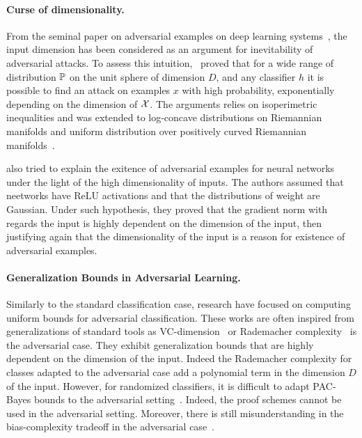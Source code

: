 \paragraph{Curse of dimensionality.} From the seminal paper on adversarial examples on deep learning systems~\citep{Szegedy2013IntriguingPO}, the input dimension has been considered as an argument for inevitability of adversarial attacks. To assess this intuition,~\citet{gilmer2018adversarial,shafahi2018adversarial} proved that for a wide range of distribution $\mathbb{P}$ on the unit sphere of dimension $D$, and any classifier $h$ it is possible to find an attack on examples $x$ with high probability, exponentially depending on the dimension of $\mathcal{X}$. The arguments relies on isoperimetric inequalities and was extended to log-concave distributions on Riemannian manifolds and uniform distribution over positively curved Riemannian manifolds~\citep{pmlr-v97-dohmatob19a}. 

\citep{simon2019first} also tried to explain the exitence of adversarial examples for neural networks under the light of the high dimensionality of inputs. The authors assumed that neetworks have ReLU activations and that the distributions of weight are Gaussian. Under such hypothesis, they proved that the gradient norm with regards the input is highly dependent on the dimension of the input, then justifying again that the dimensionality of the input is a reason for existence of adversarial examples. 




\paragraph{Generalization Bounds in Adversarial Learning.} Similarly to the standard classification case, research have focused on computing uniform bounds for adversarial classification. These works are often inspired from generalizations of standard tools as VC-dimension~\citep{cullina2018pac} or Rademacher complexity~\citep{yin2019rademacher,khim2018adversarial,awasthi2020adversarial} is the adversarial case. They exhibit generalization bounds that are highly dependent on the dimension of the input. Indeed the Rademacher complexity for classes adapted to the adversarial case add a polynomial term in the dimension $D$ of the input. However, for randomized classifiers, it is difficult to adapt PAC-Bayes bounds to the adversarial setting~\citep{viallard2021pac}. Indeed, the proof schemes cannot be used in the adversarial setting. Moreover, there is still misunderstanding in the bias-complexity tradeoff in the adversarial case~\citep{wang2018analyzing}. 

